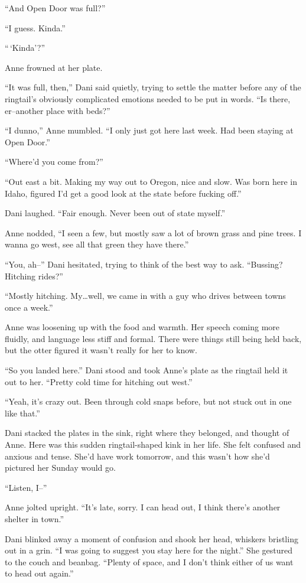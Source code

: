 ``And Open Door was full?''

``I guess. Kinda.''

``\,`Kinda'?''

Anne frowned at her plate.

``It was full, then,'' Dani said quietly, trying to settle the matter before any of the ringtail's obviously complicated emotions needed to be put in words. ``Is there, er--another place with beds?''

``I dunno,'' Anne mumbled. ``I only just got here last week. Had been staying at Open Door.''

``Where'd you come from?''

``Out east a bit. Making my way out to Oregon, nice and slow. Was born here in Idaho, figured I'd get a good look at the state before fucking off.''

Dani laughed. ``Fair enough. Never been out of state myself.''

Anne nodded, ``I seen a few, but mostly saw a lot of brown grass and pine trees. I wanna go west, see all that green they have there.''

``You, ah--'' Dani hesitated, trying to think of the best way to ask. ``Bussing? Hitching rides?''

``Mostly hitching. My\ldots{}well, we came in with a guy who drives between towns once a week.''

Anne was loosening up with the food and warmth. Her speech coming more fluidly, and language less stiff and formal. There were things still being held back, but the otter figured it wasn't really for her to know.

``So you landed here.'' Dani stood and took Anne's plate as the ringtail held it out to her. ``Pretty cold time for hitching out west.''

``Yeah, it's crazy out. Been through cold snaps before, but not stuck out in one like that.''

Dani stacked the plates in the sink, right where they belonged, and thought of Anne. Here was this sudden ringtail-shaped kink in her life. She felt confused and anxious and tense. She'd have work tomorrow, and this wasn't how she'd pictured her Sunday would go.

``Listen, I--''

Anne jolted upright. ``It's late, sorry. I can head out, I think there's another shelter in town.''

Dani blinked away a moment of confusion and shook her head, whiskers bristling out in a grin. ``I was going to suggest you stay here for the night.'' She gestured to the couch and beanbag. ``Plenty of space, and I don't think either of us want to head out again.''


